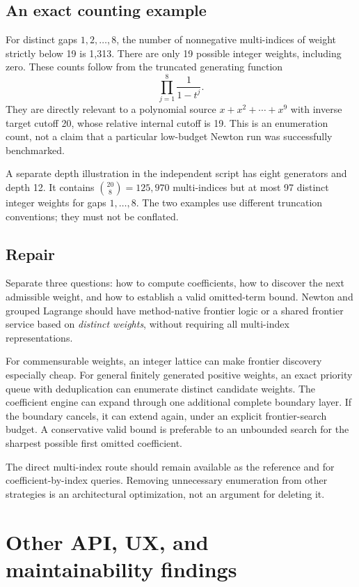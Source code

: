 \documentclass[11pt,a4paper]{article}
\begin{document}
\subsection{An exact counting example}
For distinct gaps $1,2,\ldots,8$, the number of nonnegative multi-indices of weight strictly below 19 is 1,313. There are only 19 possible integer weights, including zero. These counts follow from the truncated generating function
\[
 \prod_{j=1}^{8}\frac1{1-t^j}.
\]
They are directly relevant to a polynomial source $x+x^2+\cdots+x^9$ with inverse target cutoff 20, whose relative internal cutoff is 19. This is an enumeration count, not a claim that a particular low-budget Newton run was successfully benchmarked.

A separate depth illustration in the independent script has eight generators and depth 12. It contains $\binom{20}{8}=125{,}970$ multi-indices but at most 97 distinct integer weights for gaps $1,\ldots,8$. The two examples use different truncation conventions; they must not be conflated.

\subsection{Repair}
Separate three questions: how to compute coefficients, how to discover the next admissible weight, and how to establish a valid omitted-term bound. Newton and grouped Lagrange should have method-native frontier logic or a shared frontier service based on \emph{distinct weights}, without requiring all multi-index representations.

For commensurable weights, an integer lattice can make frontier discovery especially cheap. For general finitely generated positive weights, an exact priority queue with deduplication can enumerate distinct candidate weights. The coefficient engine can expand through one additional complete boundary layer. If the boundary cancels, it can extend again, under an explicit frontier-search budget. A conservative valid bound is preferable to an unbounded search for the sharpest possible first omitted coefficient.

The direct multi-index route should remain available as the reference and for coefficient-by-index queries. Removing unnecessary enumeration from other strategies is an architectural optimization, not an argument for deleting it.

\section{Other API, UX, and maintainability findings}
\end{document}
